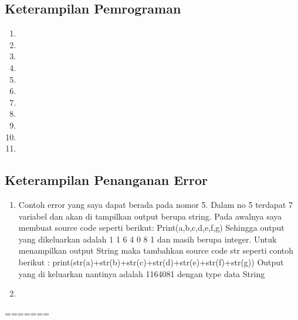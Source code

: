 \subsection{Keterampilan Pemrograman}
\begin{enumerate}
	\item 

	\item 

	\item 

	\item 

	\item 

	\item 

	\item 

	\item 

	\item 

	\item 
	
	\item 
\end{enumerate}
\subsection{Keterampilan Penanganan Error}
\begin{enumerate}
	\item Contoh error yang saya dapat berada pada nomor 5. Dalam no 5 terdapat 7 variabel dan akan di tampilkan output berupa string. Pada awalnya saya membuat source code seperti berikut:
Print(a,b,c,d,e,f,g)
Sehingga output yang dikeluarkan adalah 1 1 6 4 0 8 1 dan masih berupa integer. Untuk menampilkan output String maka tambahkan source code str seperti contoh berikut :
print(str(a)+str(b)+str(c)+str(d)+str(e)+str(f)+str(g))
Output yang di keluarkan nantinya adalah 1164081 dengan type data String
\par
	\item 
\end{enumerate}
=======
